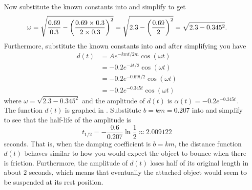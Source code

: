 \documentclass[a4paper,oneside,12pt]{article}
\begin{document}
\begin{problem}
{\begin{solution}
Now substitute the known constants into
 and simplify to get
\[
\omega
=
\sqrt{
  \frac{0.69}{0.3}
  -
  \parenthesis*{\frac{0.69 \times 0.3}{2 \times 0.3}}^2
}
=
\sqrt{
  2.3
  -
  \parenthesis*{\frac{0.69}{2}}^2
}
=
\sqrt{
  2.3
  -
  0.345^2
}.
\]
Furthermore, substitute the known constants into
 and after simplifying you
have
\begin{equation}
\label{eqn:trigonometric:damped_underdamped_b_km}
\begin{aligned}
d(t)
&=
A e^{-kmt / 2m} \cos(\omega t) \\[4pt]
&=
-0.2 e^{-kt / 2} \cos(\omega t) \\[4pt]
&=
-0.2 e^{-0.69t / 2} \cos(\omega t) \\[4pt]
&=
-0.2 e^{-0.345t} \cos(\omega t)
\end{aligned}
\end{equation}
where $\omega = \sqrt{2.3 - 0.345^2}$ and the amplitude of $d(t)$ is
$\alpha(t) = -0.2 e^{-0.345t}$.  The function $d(t)$ is graphed in
.  Substitute
$b = km = 0.207$ into
 and simplify to
see that the half-life of the amplitude is
\[
t_{1/2}
=
-\frac{0.6}{0.207} \ln\frac{1}{2}
\approx
2.009122
\]
seconds.  That is, when the damping coefficient is $b = km$, the
distance function $d(t)$ behaves similar to how you would expect the
object to bounce when there is friction.  Furthermore, the amplitude
of $d(t)$ loses half of its original length in about $2$ seconds,
which means that eventually the attached object would seem to be
suspended at its rest position.


\end{solution}}
\end{problem}
\end{document}

